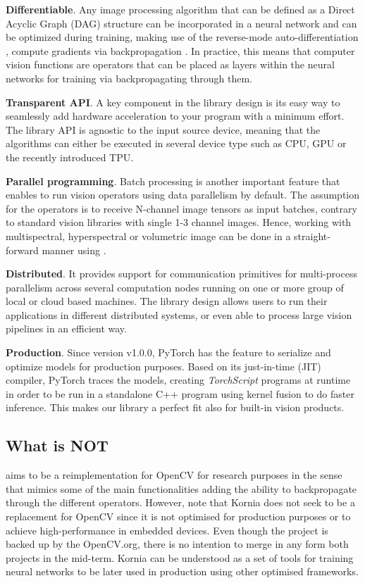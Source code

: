 \textbf{Differentiable}. Any image processing algorithm that can be defined as a Direct Acyclic Graph (DAG) structure can be incorporated in a neural network and can be optimized during training, making use of the reverse-mode \citep{Speelpenning1980CFP} auto-differentiation \citep{Griewank:2008:EDP:1455489}, compute gradients via backpropagation \citep{kelley1960gradient}. In practice, this means that computer vision functions are operators that can be placed as layers within the neural networks for training via backpropagating through them.

\textbf{Transparent API}. A key component in the library design is its easy way to seamlessly add hardware acceleration to your program with a minimum effort. The library API is agnostic to the input source device, meaning that the algorithms can either be executed in several device type such as CPU, GPU or the recently introduced TPU.

\textbf{Parallel programming}. Batch processing is another important feature that enables to run vision operators using data parallelism by default. The assumption for the operators is to receive N-channel image tensors as input batches, contrary to standard vision libraries with single 1-3 channel images. Hence, working with multispectral, hyperspectral or volumetric image can be done in a straight-forward manner using \lib{}.

\textbf{Distributed}. It provides support for communication primitives for multi-process parallelism across several computation nodes running on one or more group of local or cloud based machines. The library design allows users to run their applications in different distributed systems, or even able to process large vision pipelines in an efficient way.

\textbf{Production}. Since version v1.0.0, PyTorch has the feature to serialize and optimize models for production purposes. Based on its just-in-time (JIT) compiler, PyTorch traces the models, creating \textit{TorchScript} programs at runtime in order to be run in a standalone C++ program using kernel fusion to do faster inference. This makes our library a perfect fit also for built-in vision products.

\subsection*{What \lib \hspace{1px} is NOT}

\lib{} aims to be a reimplementation for OpenCV for research purposes in the sense that mimics some of the main functionalities adding the ability to backpropagate through the different operators. However, note that Kornia does not seek to be a replacement for OpenCV since it is not optimised for production purposes or to achieve  high-performance in embedded devices. Even though the project is backed up by the OpenCV.org, there is no intention to merge in any form both projects in the mid-term. Kornia can be understood as a set of tools for training neural networks to be later used in production using other optimised frameworks.

